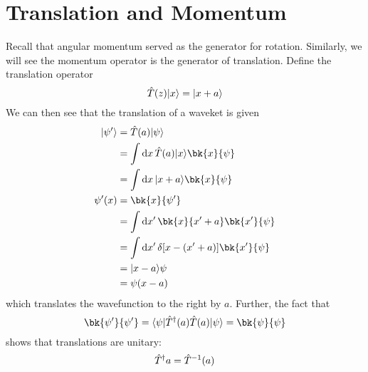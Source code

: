 \section{Translation and Momentum}
Recall that angular momentum served as the generator for rotation. Similarly, we will see the momentum operator is the generator of translation. Define the translation operator
\begin{equation}
	\hat{T}(z)\lvert x\rangle=\lvert x+a\rangle
\end{equation}
We can then see that the translation of a waveket is given
\begin{align*}
	\k{\p'}&=\hat T(a)\k\p\\
	       &=\int\d{x}\hat T(a)\k{x}\bk{x}{\p}\\
	       &=\int\d{x}\k{x+a}\bk{x}{\p}\\
	\p'(x)&=\bk{x}{\p'}\\
	      &=\int\d{x'}\bk{x}{x'+a}\bk{x'}{\p}\\
	      &=\int\d{x'}\delta[x-(x'+a)]\bk{x'}{\p}\\
	      &=\k{x-a}{\p}\\
	      &=\p(x-a)
\end{align*}
which translates the wavefunction to the right by \(a\). Further, the fact that
\[\bk{\p'}{\p'}=\b{\p}\hat T\adj(a)\hat T(a)\k{\p}=\bk{\p}{\p}\]
shows that translations are unitary:
\begin{equation}
	\hat T^{\dagger}{a}=\hat{T}^{-1}(a)
\end{equation}

